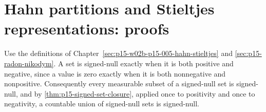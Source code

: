 \section{Hahn partitions and Stieltjes representations: proofs}
\label{sec:annex-p15-w02b-p15-005-hahn-stieltjes}

Use the definitions of
Chapter~\ref{sec:p15-w02b-p15-005-hahn-stieltjes} and
\cref{sec:p15-radon-nikodym}. A set is signed-null exactly when it is
both positive and negative, since a value is zero exactly when it is
both nonnegative and nonpositive. Consequently every measurable subset
of a signed-null set is signed-null, and by
\cref{thm:p15-signed-set-closure}, applied once to positivity and once to
negativity, a countable union of signed-null sets is signed-null.

